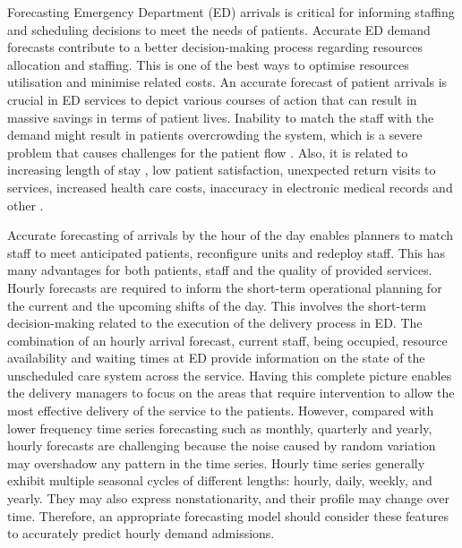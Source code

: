 \documentclass[]{elsarticle} %
\begin{document}
Forecasting Emergency Department (ED) arrivals is critical for informing staffing and scheduling decisions to meet the needs of patients. Accurate ED demand forecasts contribute to a better decision-making process regarding resources allocation and staffing. This is one of the best ways to optimise resources utilisation and minimise related costs. An accurate forecast of patient arrivals is crucial in ED services to depict various courses of action that can result in massive savings in terms of patient lives. Inability to match the staff with the demand might result in patients overcrowding the system, which is a severe problem that causes challenges for the patient flow \citep{derlet2002overcrowding}. Also, it is related to increasing length of stay \citep{muhammet2015forecasting}, low patient satisfaction, unexpected return visits to services, increased health care costs, inaccuracy in electronic medical records and other \citep{rostami2020anticipating}.

Accurate forecasting of arrivals by the hour of the day enables planners to match staff to meet anticipated patients, reconfigure units and redeploy staff. This has many advantages for both patients, staff and the quality of provided services. Hourly forecasts are required to inform the short-term operational planning for the current and the upcoming shifts of the day. This involves the short-term decision-making related to the execution of the delivery process in ED. The combination of an hourly arrival forecast, current staff, being occupied, resource availability and waiting times at ED provide information on the state of the unscheduled care system across the service. Having this complete picture enables the delivery managers to focus on the areas that require intervention to allow the most effective delivery of the service to the patients. However, compared with lower frequency time series forecasting such as monthly, quarterly and yearly, hourly forecasts are challenging because the noise caused by random variation may overshadow any pattern in the time series. Hourly time series generally exhibit multiple seasonal cycles of different lengths: hourly, daily, weekly, and yearly. They may also express nonstationarity, and their profile may change over time. Therefore, an appropriate forecasting model should consider these features to accurately predict hourly demand admissions.
\end{document}
